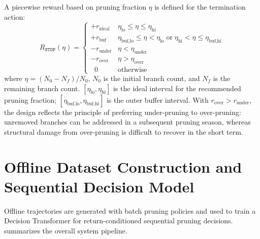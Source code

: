 \documentclass[12pt,a4paper,fontset=fandol]{ctexart}
\begin{document}
A piecewise reward based on pruning fraction $\eta$ is defined for the termination action:
\begin{equation}\label{eq:stop_reward}
  R_{\texttt{STOP}}(\eta) =
  \begin{cases}
    +r_{\text{ideal}} & \eta_{\text{lo}} \leq \eta \leq \eta_{\text{hi}} \\
    +r_{\text{buf}} & \eta_{\text{buf,lo}} \leq \eta < \eta_{\text{lo}} \;\text{or}\; \eta_{\text{hi}} < \eta \leq \eta_{\text{buf,hi}} \\
    -r_{\text{under}} & \eta < \eta_{\text{under}} \\
    -r_{\text{over}} & \eta > \eta_{\text{over}} \\
    \;\;0 & \text{otherwise}
  \end{cases}
\end{equation}
where $\eta = (N_0 - N_f) / N_0$,
$N_0$ is the initial branch count, and $N_f$ is the remaining branch count.
$[\eta_{\text{lo}}, \eta_{\text{hi}}]$ is the ideal interval for the recommended pruning fraction;
$[\eta_{\text{buf,lo}}, \eta_{\text{buf,hi}}]$ is the outer buffer interval.
With $r_{\text{over}} > r_{\text{under}}$,
the design reflects the principle of preferring under-pruning to over-pruning:
unremoved branches can be addressed in a subsequent pruning season,
whereas structural damage from over-pruning is difficult to recover in the short term.

\section{Offline Dataset Construction and Sequential Decision Model}\label{sec:model}

Offline trajectories are generated with batch pruning policies and used to train a Decision Transformer for return-conditioned sequential pruning decisions.
 summarizes the overall system pipeline.
\end{document}
